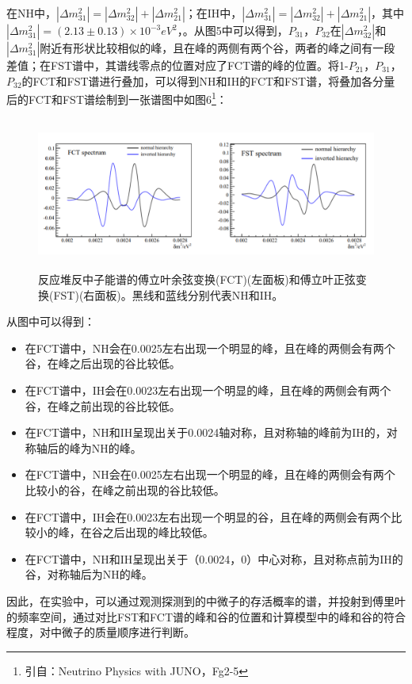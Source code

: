 \documentclass[10pt,a4paper]{article}
\begin{document}
在NH中，$|\Delta m_{31}^2|=|\Delta m_{32}^2|+|\Delta m_{21}^2|$；在IH中，$|\Delta m_{31}^2|=|\Delta m_{32}^2|+|\Delta m_{21}^2|$，其中$|\Delta m_{31}^2|=(2.13 \pm 0.13) \times 10^{-3}{eV}^2 $，。从图5中可以得到，$P_{31}$，$P_{32}$在$|\Delta m_{32}^2|$和$|\Delta m_{31}^2|$附近有形状比较相似的峰，且在峰的两侧有两个谷，两者的峰之间有一段差值；在FST谱中，其谱线零点的位置对应了FCT谱的峰的位置。将1-$P_{21}$，$P_{31}$，$P_{32}$的FCT和FST谱进行叠加，可以得到NH和IH的FCT和FST谱，将叠加各分量后的FCT和FST谱绘制到一张谱图中如图6\footnote{引自：Neutrino Physics with JUNO，Fg2-5}：
\begin{figure}[ht]
 \centering
 \includegraphics[height=5cm]{images/傅里叶图谱.png}
 \caption{反应堆反中子能谱的傅立叶余弦变换(FCT)(左面板)和傅立叶正弦变换(FST)(右面板)。黑线和蓝线分别代表NH和IH。}
 \label{fig:singleblock}
\end{figure}

从图中可以得到：
\begin{itemize}
	\item{在FCT谱中，NH会在0.0025左右出现一个明显的峰，且在峰的两侧会有两个谷，在峰之后出现的谷比较低。}
    \item{在FCT谱中，IH会在0.0023左右出现一个明显的峰，且在峰的两侧会有两个谷，在峰之前出现的谷比较低。}
    \item{在FCT谱中，NH和IH呈现出关于0.0024轴对称，且对称轴的峰前为IH的，对称轴后的峰为NH的峰。}
    \item{在FCT谱中，NH会在0.0025左右出现一个明显的峰，且在峰的两侧会有两个比较小的谷，在峰之前出现的谷比较低。}
    \item{在FCT谱中，IH会在0.0023左右出现一个明显的谷，且在峰的两侧会有两个比较小的峰，在谷之后出现的峰比较低。}
    \item{在FCT谱中，NH和IH呈现出关于（0.0024，0）中心对称，且对称点前为IH的谷，对称轴后为NH的峰。}
\end{itemize}

因此，在实验中，可以通过观测探测到的中微子的存活概率的谱，并投射到傅里叶的频率空间，通过对比FST和FCT谱的峰和谷的位置和计算模型中的峰和谷的符合程度，对中微子的质量顺序进行判断。
\end{document}
